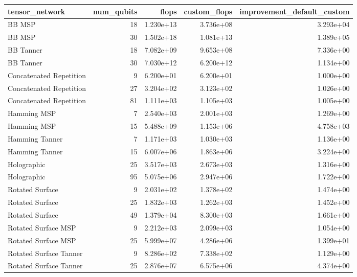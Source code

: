 \begin{tabular}{lrrrr}
\toprule
tensor_network & num_qubits & flops & custom_flops & improvement_default_custom \\
\midrule
BB MSP & 18 & 1.230e+13 & 3.736e+08 & 3.293e+04 \\
BB MSP & 30 & 1.502e+18 & 1.081e+13 & 1.389e+05 \\
BB Tanner & 18 & 7.082e+09 & 9.653e+08 & 7.336e+00 \\
BB Tanner & 30 & 7.030e+12 & 6.200e+12 & 1.134e+00 \\
Concatenated Repetition & 9 & 6.200e+01 & 6.200e+01 & 1.000e+00 \\
Concatenated Repetition & 27 & 3.204e+02 & 3.123e+02 & 1.026e+00 \\
Concatenated Repetition & 81 & 1.111e+03 & 1.105e+03 & 1.005e+00 \\
Hamming MSP & 7 & 2.540e+03 & 2.001e+03 & 1.269e+00 \\
Hamming MSP & 15 & 5.488e+09 & 1.153e+06 & 4.758e+03 \\
Hamming Tanner & 7 & 1.171e+03 & 1.030e+03 & 1.136e+00 \\
Hamming Tanner & 15 & 6.007e+06 & 1.863e+06 & 3.224e+00 \\
Holographic & 25 & 3.517e+03 & 2.673e+03 & 1.316e+00 \\
Holographic & 95 & 5.075e+06 & 2.947e+06 & 1.722e+00 \\
Rotated Surface & 9 & 2.031e+02 & 1.378e+02 & 1.474e+00 \\
Rotated Surface & 25 & 1.832e+03 & 1.262e+03 & 1.452e+00 \\
Rotated Surface & 49 & 1.379e+04 & 8.300e+03 & 1.661e+00 \\
Rotated Surface MSP & 9 & 2.212e+03 & 2.099e+03 & 1.054e+00 \\
Rotated Surface MSP & 25 & 5.999e+07 & 4.286e+06 & 1.399e+01 \\
Rotated Surface Tanner & 9 & 8.286e+02 & 7.338e+02 & 1.129e+00 \\
Rotated Surface Tanner & 25 & 2.876e+07 & 6.575e+06 & 4.374e+00 \\
\bottomrule
\end{tabular}
